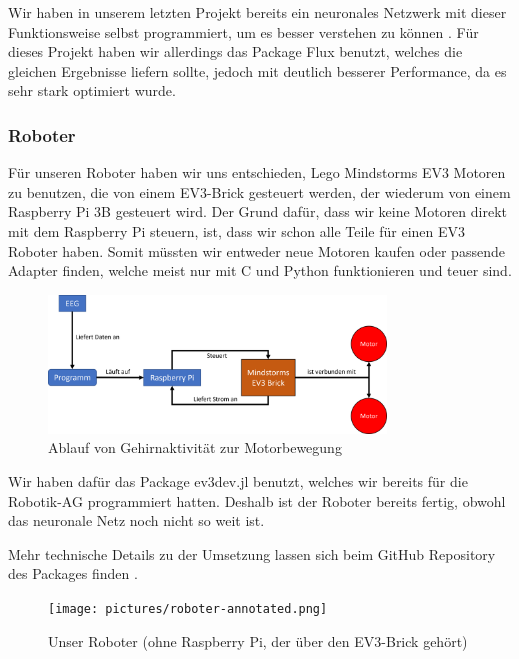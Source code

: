 \documentclass{scrartcl}
\begin{document}
	Wir haben in unserem letzten Projekt bereits ein neuronales Netzwerk mit dieser Funktionsweise selbst programmiert, um es besser verstehen zu können \cite{AIComposer}. Für dieses Projekt haben wir allerdings das Package Flux benutzt, welches die gleichen Ergebnisse liefern sollte, jedoch mit deutlich besserer Performance, da es sehr stark optimiert wurde.

	\subsubsection{Roboter}

	Für unseren Roboter haben wir uns entschieden, Lego Mindstorms EV3 Motoren zu benutzen, die von einem EV3-Brick gesteuert werden, der wiederum von einem Raspberry Pi 3B gesteuert wird. Der Grund dafür, dass wir keine Motoren direkt mit dem Raspberry Pi steuern, ist, dass wir schon alle Teile für einen EV3 Roboter haben. Somit müssten wir entweder neue Motoren kaufen oder passende Adapter finden, welche meist nur mit C und Python funktionieren und teuer sind.

	\begin{figure}[h!]
		\centering
		\includegraphics[width=0.8\textwidth]{pictures/roboter-funktionsweise.png}
		\caption{Ablauf von Gehirnaktivität zur Motorbewegung}
	\end{figure}

	Wir haben dafür das Package ev3dev.jl benutzt, welches wir bereits für die Robotik-AG programmiert hatten. Deshalb ist der Roboter bereits fertig, obwohl das neuronale Netz noch nicht so weit ist.

	Mehr technische Details zu der Umsetzung lassen sich beim GitHub Repository des Packages finden \cite{ev3dev}.

	\begin{figure}[h!]
		\centering
		\texttt{[image: pictures/roboter-annotated.png]}
		\caption{Unser Roboter (ohne Raspberry Pi, der über den EV3-Brick gehört)}
	\end{figure}

\end{document}
